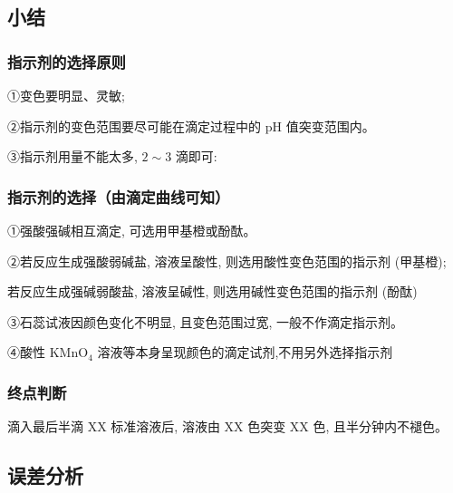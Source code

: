 \documentclass[10pt,cn]{elegantbook}
\begin{document}
\subsection{小结}

\subsubsection{指示剂的选择原则}

①变色要明显、灵敏;

②指示剂的变色范围要尽可能在滴定过程中的 \(\mathrm{{pH}}\) 值突变范围内。

③指示剂用量不能太多, \(2 \sim 3\) 滴即可:

\subsubsection{指示剂的选择（由滴定曲线可知）}

①强酸强碱相互滴定, 可选用甲基橙或酚酞。

②若反应生成强酸弱碱盐, 溶液呈酸性, 则选用酸性变色范围的指示剂 (甲基橙);

若反应生成强碱弱酸盐, 溶液呈碱性, 则选用碱性变色范围的指示剂 (酚酞)

③石蕊试液因颜色变化不明显, 且变色范围过宽, 一般不作滴定指示剂。

④酸性 \({\mathrm{{KMnO}}}_{4}\) 溶液等本身呈现颜色的滴定试剂,不用另外选择指示剂

\subsubsection{终点判断}

 滴入最后半滴 XX 标准溶液后, 溶液由 XX 色突变 XX 色, 且半分钟内不褪色。

\begin{center}
\end{center}

\subsection{误差分析}
\end{document}
